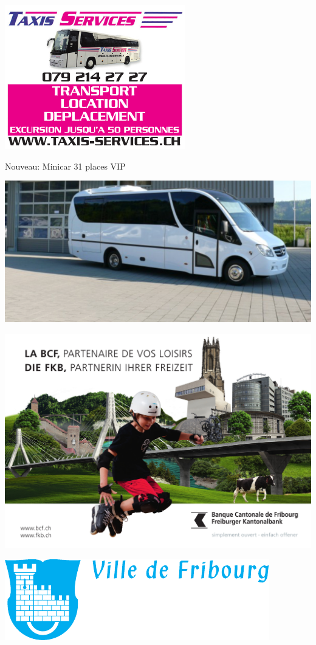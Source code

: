 {\centering
\includegraphics[width=.95\textwidth]{taxi.pdf}
\par
\vspace*{20mm}

{\Huge
Nouveau: Minicar 31 places VIP}
\par
\includegraphics[width=.8\textwidth]{bus.png}
\par
}
\clearpage
\thispagestyle{empty}%
{\centering
\includegraphics[width=\textwidth]{bcf.jpg}
\par
\vspace*{20mm}
\vfill
\includegraphics[width=.8\textwidth]{ville.pdf}
\vfill
\par
}
